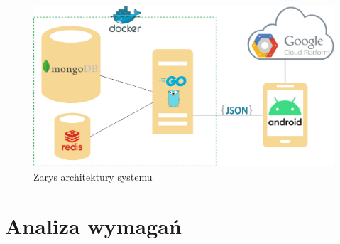 \begin{figure}[ht]
    \centering
        \includegraphics[width=0.7\linewidth]{rys02/system_architecture_diagram4.png}
    \caption{Zarys architektury systemu} %
    \label{fig:systemarchitecturediagram}
\end{figure}

\section{Analiza wymagań}
